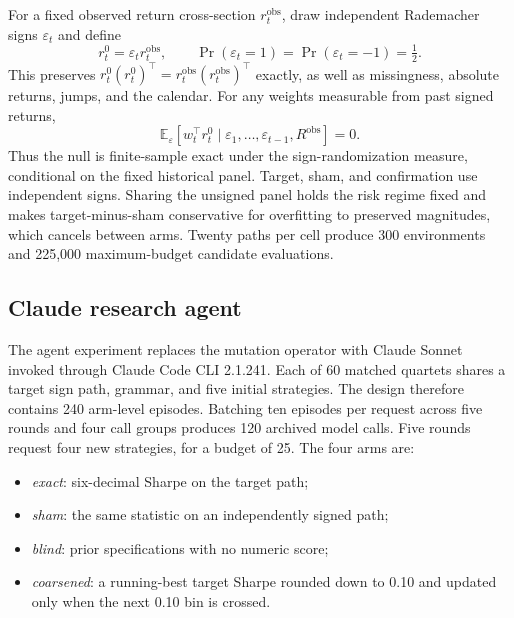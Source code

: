 \documentclass[sigconf,nonacm]{acmart}
\begin{document}
For a fixed observed return cross-section $r_t^{\mathrm{obs}}$, draw independent
Rademacher signs $\varepsilon_t$ and define
\begin{equation}
 r_t^{0}=\varepsilon_t r_t^{\mathrm{obs}},\qquad
 \Pr(\varepsilon_t=1)=\Pr(\varepsilon_t=-1)=\tfrac12.
\end{equation}
This preserves $r_t^{0}(r_t^{0})^\top=r_t^{\mathrm{obs}}
(r_t^{\mathrm{obs}})^\top$ exactly, as well as missingness, absolute returns,
jumps, and the calendar. For any weights measurable from past signed returns,
\begin{equation}
 \mathbb{E}_{\varepsilon}
 \left[w_t^\top r_t^{0}\mid
 \varepsilon_1,\ldots,\varepsilon_{t-1},R^{\mathrm{obs}}\right]=0.
\end{equation}
Thus the null is finite-sample exact under the sign-randomization measure,
conditional on the fixed historical panel. Target, sham, and confirmation use
independent signs. Sharing the unsigned panel holds the risk regime fixed and
makes target-minus-sham conservative for overfitting to preserved magnitudes,
which cancels between arms. Twenty paths per cell produce 300 environments and
225,000 maximum-budget candidate evaluations.

\subsection{Claude research agent}

The agent experiment replaces the mutation operator with Claude Sonnet invoked
through Claude Code CLI 2.1.241. Each of 60 matched quartets shares a target
sign path, grammar, and five initial strategies. The design therefore contains
240 arm-level episodes. Batching ten episodes per request across five rounds
and four call groups produces 120 archived model calls. Five rounds request four
new strategies, for a budget of 25. The four arms are:

\begin{itemize}
  \item \emph{exact}: six-decimal Sharpe on the target path;
  \item \emph{sham}: the same statistic on an independently signed path;
  \item \emph{blind}: prior specifications with no numeric score;
  \item \emph{coarsened}: a running-best target Sharpe rounded down to 0.10 and
  updated only when the next 0.10 bin is crossed.
\end{itemize}
\end{document}

